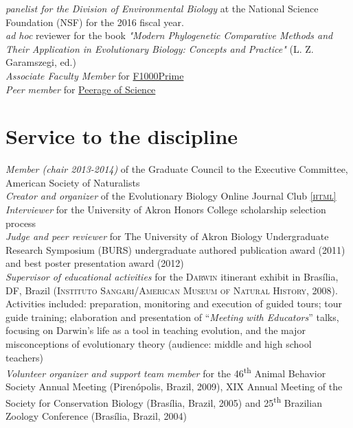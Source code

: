 \documentclass[10pt]{article}
\newcommand{\html}[1]{\href{#1}{\scriptsize\textsc{[html]}}}
\newcommand{\years}[1]{\marginnote{\raggedleft\scriptsize #1}}
\begin{document}
\textit{panelist for the Division of Environmental Biology} at the National Science Foundation (NSF) for the 2016 fiscal year.\\

\textit{ad hoc} reviewer for the book \textit{"Modern Phylogenetic Comparative Methods and Their Application in Evolutionary Biology: Concepts and Practice"} (L. Z. Garamszegi, ed.)\\

\textit{Associate Faculty Member} for \href{http://f1000.com/prime/thefaculty/member/499999771097524591}{F1000Prime}\\

\textit{Peer member} for \href{http://www.peerageofscience.org/}{Peerage of Science}

\section*{Service to the discipline}
\years{2012-2014} \emph{Member (chair 2013-2014)} of the Graduate Council to the Executive Committee, American Society of Naturalists\\

\years{2012-2013} \emph{Creator and organizer} of the Evolutionary Biology Online Journal Club \html{http://evobiojournalclub.wordpress.com}\\

\years{2012} \emph{Interviewer} for the University of Akron Honors College scholarship selection process\\

\years{2011-2012} \emph{Judge and peer reviewer} for The University of Akron Biology Undergraduate Research Symposium (\textsc{BURS}) undergraduate authored publication award (2011) and best poster presentation award (2012)\\

\years{2008} \emph{Supervisor of educational activities} for the \textsc{Darwin} itinerant exhibit in Brasília, DF, Brazil (\textsc{Instituto Sangari/American Museum of Natural History}, 2008). Activities included: preparation, monitoring and execution of guided tours; tour guide training; elaboration and presentation of “\emph{Meeting with Educators}” talks, focusing on Darwin’s life as a tool in teaching evolution, and the major misconceptions of evolutionary theory (audience: middle and high school teachers)\\

\emph{Volunteer organizer and support team member} for the 46\textsuperscript{th} Animal Behavior Society Annual Meeting (Pirenópolis, Brazil, 2009), XIX Annual Meeting of the Society for Conservation Biology (Brasília, Brazil, 2005) and 25\textsuperscript{th} Brazilian Zoology Conference (Brasília, Brazil, 2004)
\end{document}
